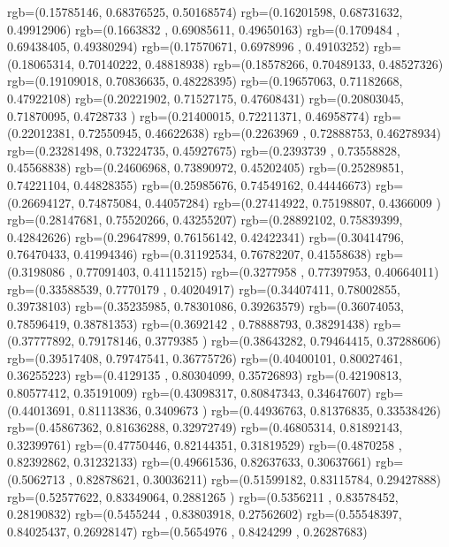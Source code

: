 {{{      rgb=(0.15785146,  0.68376525,  0.50168574)
      rgb=(0.16201598,  0.68731632,  0.49912906)
      rgb=(0.1663832 ,  0.69085611,  0.49650163)
      rgb=(0.1709484 ,  0.69438405,  0.49380294)
      rgb=(0.17570671,  0.6978996 ,  0.49103252)
      rgb=(0.18065314,  0.70140222,  0.48818938)
      rgb=(0.18578266,  0.70489133,  0.48527326)
      rgb=(0.19109018,  0.70836635,  0.48228395)
      rgb=(0.19657063,  0.71182668,  0.47922108)
      rgb=(0.20221902,  0.71527175,  0.47608431)
      rgb=(0.20803045,  0.71870095,  0.4728733 )
      rgb=(0.21400015,  0.72211371,  0.46958774)
      rgb=(0.22012381,  0.72550945,  0.46622638)
      rgb=(0.2263969 ,  0.72888753,  0.46278934)
      rgb=(0.23281498,  0.73224735,  0.45927675)
      rgb=(0.2393739 ,  0.73558828,  0.45568838)
      rgb=(0.24606968,  0.73890972,  0.45202405)
      rgb=(0.25289851,  0.74221104,  0.44828355)
      rgb=(0.25985676,  0.74549162,  0.44446673)
      rgb=(0.26694127,  0.74875084,  0.44057284)
      rgb=(0.27414922,  0.75198807,  0.4366009 )
      rgb=(0.28147681,  0.75520266,  0.43255207)
      rgb=(0.28892102,  0.75839399,  0.42842626)
      rgb=(0.29647899,  0.76156142,  0.42422341)
      rgb=(0.30414796,  0.76470433,  0.41994346)
      rgb=(0.31192534,  0.76782207,  0.41558638)
      rgb=(0.3198086 ,  0.77091403,  0.41115215)
      rgb=(0.3277958 ,  0.77397953,  0.40664011)
      rgb=(0.33588539,  0.7770179 ,  0.40204917)
      rgb=(0.34407411,  0.78002855,  0.39738103)
      rgb=(0.35235985,  0.78301086,  0.39263579)
      rgb=(0.36074053,  0.78596419,  0.38781353)
      rgb=(0.3692142 ,  0.78888793,  0.38291438)
      rgb=(0.37777892,  0.79178146,  0.3779385 )
      rgb=(0.38643282,  0.79464415,  0.37288606)
      rgb=(0.39517408,  0.79747541,  0.36775726)
      rgb=(0.40400101,  0.80027461,  0.36255223)
      rgb=(0.4129135 ,  0.80304099,  0.35726893)
      rgb=(0.42190813,  0.80577412,  0.35191009)
      rgb=(0.43098317,  0.80847343,  0.34647607)
      rgb=(0.44013691,  0.81113836,  0.3409673 )
      rgb=(0.44936763,  0.81376835,  0.33538426)
      rgb=(0.45867362,  0.81636288,  0.32972749)
      rgb=(0.46805314,  0.81892143,  0.32399761)
      rgb=(0.47750446,  0.82144351,  0.31819529)
      rgb=(0.4870258 ,  0.82392862,  0.31232133)
      rgb=(0.49661536,  0.82637633,  0.30637661)
      rgb=(0.5062713 ,  0.82878621,  0.30036211)
      rgb=(0.51599182,  0.83115784,  0.29427888)
      rgb=(0.52577622,  0.83349064,  0.2881265 )
      rgb=(0.5356211 ,  0.83578452,  0.28190832)
      rgb=(0.5455244 ,  0.83803918,  0.27562602)
      rgb=(0.55548397,  0.84025437,  0.26928147)
      rgb=(0.5654976 ,  0.8424299 ,  0.26287683)
}}}
